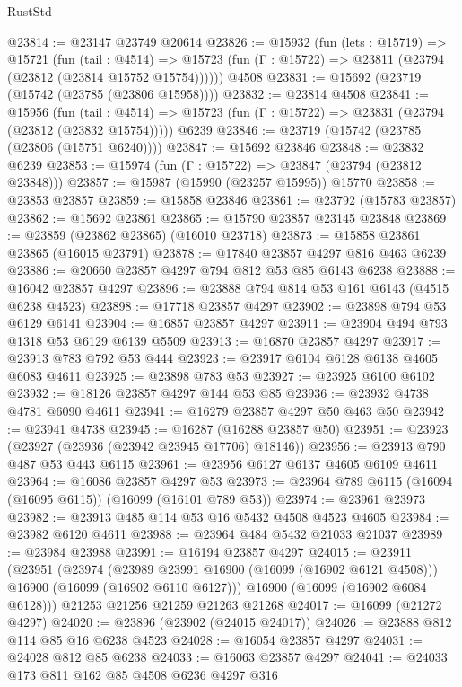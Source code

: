 \begin{lexlean}{RustStd}
\begin{coremodule}
@23814 := @23147 @23749 @20614
@23826 := @15932
    (fun (lets : @15719) =>
    @15721
      (fun (tail : @4514) =>
      @15723 (fun (Γ : @15722) => @23811 (@23794 (@23812 (@23814 @15752 @15754))))))
    @4508
@23831 := @15692 (@23719 (@15742 (@23785 (@23806 @15958))))
@23832 := @23814 @4508
@23841 := @15956
    (fun (tail : @4514) => @15723 (fun (Γ : @15722) => @23831 (@23794 (@23812 (@23832 @15754)))))
    @6239
@23846 := @23719 (@15742 (@23785 (@23806 (@15751 @6240))))
@23847 := @15692 @23846
@23848 := @23832 @6239
@23853 := @15974 (fun (Γ : @15722) => @23847 (@23794 (@23812 @23848)))
@23857 := @15987 (@15990 (@23257 @15995)) @15770
@23858 := @23853 @23857
@23859 := @15858 @23846
@23861 := @23792 (@15783 @23857)
@23862 := @15692 @23861
@23865 := @15790 @23857 @23145 @23848
@23869 := @23859 (@23862 @23865) (@16010 @23718)
@23873 := @15858 @23861 @23865 (@16015 @23791)
@23878 := @17840 @23857 @4297 @816 @463 @6239
@23886 := @20660 @23857 @4297 @794 @812 @53 @85 @6143 @6238
@23888 := @16042 @23857 @4297
@23896 := @23888 @794 @814 @53 @161 @6143 (@4515 @6238 @4523)
@23898 := @17718 @23857 @4297
@23902 := @23898 @794 @53 @6129 @6141
@23904 := @16857 @23857 @4297
@23911 := @23904 @494 @793 @1318 @53 @6129 @6139 @5509
@23913 := @16870 @23857 @4297
@23917 := @23913 @783 @792 @53 @444
@23923 := @23917 @6104 @6128 @6138 @4605 @6083 @4611
@23925 := @23898 @783 @53
@23927 := @23925 @6100 @6102
@23932 := @18126 @23857 @4297 @144 @53 @85
@23936 := @23932 @4738 @4781 @6090 @4611
@23941 := @16279 @23857 @4297 @50 @463 @50
@23942 := @23941 @4738
@23945 := @16287 (@16288 @23857 @50)
@23951 := @23923 (@23927 (@23936 (@23942 @23945 @17706) @18146))
@23956 := @23913 @790 @487 @53 @443 @6115
@23961 := @23956 @6127 @6137 @4605 @6109 @4611
@23964 := @16086 @23857 @4297 @53
@23973 := @23964 @789 @6115 (@16094 (@16095 @6115)) (@16099 (@16101 @789 @53))
@23974 := @23961 @23973
@23982 := @23913 @485 @114 @53 @16 @5432 @4508 @4523 @4605
@23984 := @23982 @6120 @4611
@23988 := @23964 @484 @5432 @21033 @21037
@23989 := @23984 @23988
@23991 := @16194 @23857 @4297
@24015 := @23911
    (@23951
      (@23974
        (@23989 @23991 @16900 (@16099 (@16902 @6121 @4508)))
        @16900
        (@16099 (@16902 @6110 @6127)))
      @16900
      (@16099 (@16902 @6084 @6128)))
    @21253
    @21256
    @21259
    @21263
    @21268
@24017 := @16099 (@21272 @4297)
@24020 := @23896 (@23902 (@24015 @24017))
@24026 := @23888 @812 @114 @85 @16 @6238 @4523
@24028 := @16054 @23857 @4297
@24031 := @24028 @812 @85 @6238
@24033 := @16063 @23857 @4297
@24041 := @24033 @173 @811 @162 @85 @4508 @6236 @4297 @316

\end{coremodule}
\end{lexlean}
